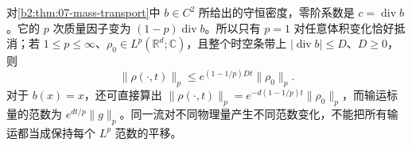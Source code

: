 \ProseParagraphBreak

对\cref{b2:thm:07-mass-transport}中 \(b\in C^2\) 所给出的守恒密度，零阶系数是 \(c=\operatorname{div}b\)。它的 \(p\) 次质量因子变为 \((1-p)\operatorname{div}b\)。所以只有 \(p=1\) 对任意体积变化恰好抵消；若 \(1\leq p\leq\infty\)、\(\rho_0\in L^p(\mathbb R^d;\mathbb C)\)，且整个时空条带上 \(|\operatorname{div}b|\leq D\)、\(D\geq0\)，则
\[
 \|\rho(\cdot,t)\|_p\leq e^{(1-1/p)Dt}\|\rho_0\|_p.
\]
对于 \(b(x)=x\)，还可直接算出 \(\|\rho(\cdot,t)\|_p=e^{-d(1-1/p)t}\|\rho_0\|_p\)，而输运标量的范数为 \(e^{dt/p}\|g\|_p\)。同一流对不同物理量产生不同范数变化，不能把所有输运都当成保持每个 \(L^p\) 范数的平移。
